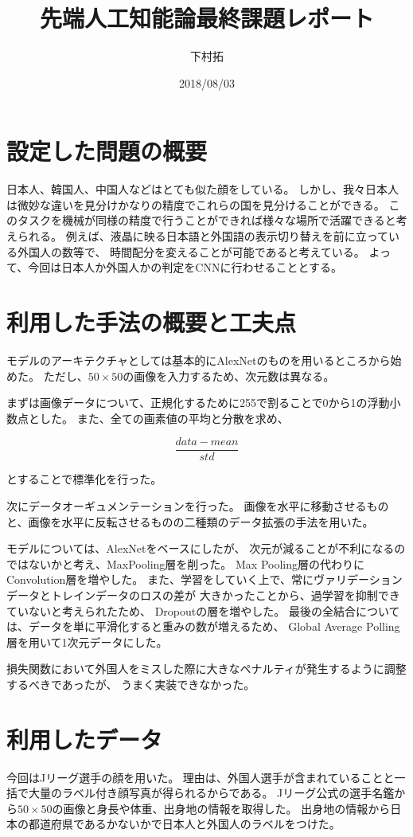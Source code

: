 \documentclass[uplatex]{jsarticle}
\begin{document}
\title{先端人工知能論最終課題レポート}
\author{下村拓}
\date{2018/08/03}
\maketitle


\section{設定した問題の概要}
日本人、韓国人、中国人などはとても似た顔をしている。
しかし、我々日本人は微妙な違いを見分けかなりの精度でこれらの国を見分けることができる。
このタスクを機械が同様の精度で行うことができれば様々な場所で活躍できると考えられる。
例えば、液晶に映る日本語と外国語の表示切り替えを前に立っている外国人の数等で、
時間配分を変えることが可能であると考えている。
よって、今回は日本人か外国人かの判定をCNNに行わせることとする。


\section{利用した手法の概要と工夫点}
モデルのアーキテクチャとしては基本的にAlexNetのものを用いるところから始めた。
ただし、$50\times50$の画像を入力するため、次元数は異なる。

まずは画像データについて、正規化するために255で割ることで0から1の浮動小数点とした。
また、全ての画素値の平均と分散を求め、

\begin{equation}
  \frac{data - mean}{std}
\end{equation}

とすることで標準化を行った。

次にデータオーギュメンテーションを行った。
画像を水平に移動させるものと、画像を水平に反転させるものの二種類のデータ拡張の手法を用いた。

モデルについては、AlexNetをベースにしたが、
次元が減ることが不利になるのではないかと考え、MaxPooling層を削った。
Max Pooling層の代わりにConvolution層を増やした。
また、学習をしていく上で、常にヴァリデーションデータとトレインデータのロスの差が
大きかったことから、過学習を抑制できていないと考えられたため、
Dropoutの層を増やした。
最後の全結合については、データを単に平滑化すると重みの数が増えるため、
Global Average Polling層を用いて1次元データにした。

損失関数において外国人をミスした際に大きなペナルティが発生するように調整するべきであったが、
うまく実装できなかった。


\section{利用したデータ}
今回はJリーグ選手の顔を用いた。
理由は、外国人選手が含まれていることと一括で大量のラベル付き顔写真が得られるからである。
Jリーグ公式の選手名鑑から$50\times50$の画像と身長や体重、出身地の情報を取得した。
出身地の情報から日本の都道府県であるかないかで日本人と外国人のラベルをつけた。
\end{document}
